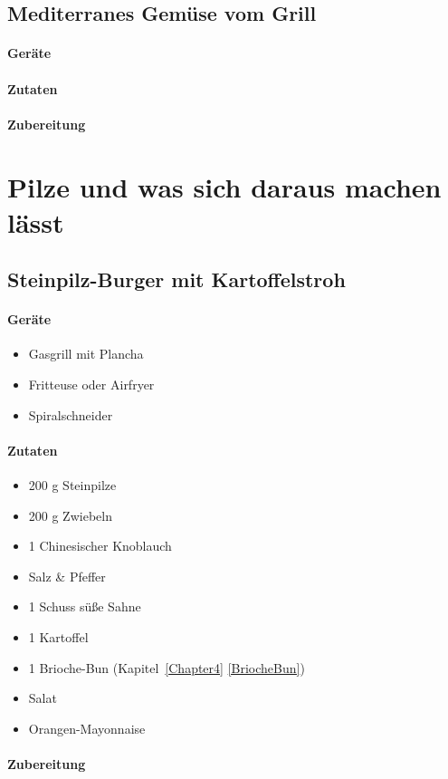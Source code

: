 \subsection{Mediterranes Gemüse vom Grill}

\paragraph{Geräte}

\paragraph{Zutaten}

\paragraph{Zubereitung}



\section{Pilze und was sich daraus machen lässt}

\subsection{Steinpilz-Burger mit Kartoffelstroh}

\paragraph{Geräte}

\begin{itemize}[noitemsep]
	\item Gasgrill mit Plancha
	\item Fritteuse oder Airfryer
	\item Spiralschneider
\end{itemize}

\paragraph{Zutaten}

\begin{itemize}[noitemsep]
	\item 200 g Steinpilze
	\item 200 g Zwiebeln
	\item 1 Chinesischer Knoblauch
	\item Salz \& Pfeffer
	\item 1 Schuss süße Sahne
	\item 1 Kartoffel
	\item 1 Brioche-Bun (Kapitel~\ref{Chapter4} \vref{BriocheBun})
	\item Salat
	\item Orangen-Mayonnaise
\end{itemize}

\paragraph{Zubereitung}



